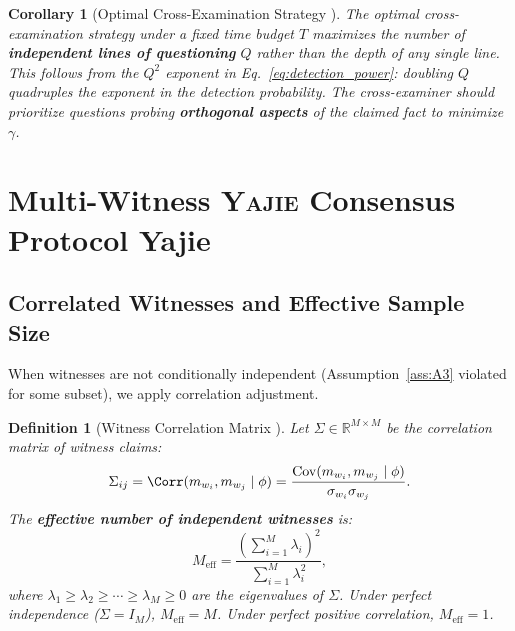 \documentclass[11pt,a4paper]{article}
\newtheorem{corollary}[theorem]{Corollary}
\newtheorem{definition}[theorem]{Definition}
\theoremstyle{definition}
\newcommand{\Yajie}{\textsc{Yajie}}
\DeclareMathOperator{\Cov}{Cov}
\newcommand{\R}{\mathbb{R}}
\newcommand{\fact}{\phi}                        %
\begin{document}
\begin{corollary}[Optimal Cross-Examination Strategy ]
\label{cor:optimal_cross}
The optimal cross-examination strategy under a fixed time budget $T$ maximizes the number of \textbf{independent lines of questioning} $Q$ rather than the depth of any single line. This follows from the $Q^2$ exponent in Eq.~\eqref{eq:detection_power}: doubling $Q$ quadruples the exponent in the detection probability. The cross-examiner should prioritize questions probing \textbf{orthogonal aspects} of the claimed fact to minimize $\gamma$.
\end{corollary}

\section{Multi-Witness \Yajie{} Consensus Protocol Yajie}
\label{sec:yajie}

\subsection{Correlated Witnesses and Effective Sample Size }
\label{sec:dependence}

When witnesses are not conditionally independent (Assumption~\ref{ass:A3} violated for some subset), we apply correlation adjustment.

\begin{definition}[Witness Correlation Matrix ]
\label{def:corrmat}
Let $\Sigma \in \R^{M \times M}$ be the correlation matrix of witness claims:
\begin{equation}
    \Sigma_{ij} = \Corr(m_{w_i}, m_{w_j} \mid \fact) = \frac{\Cov(m_{w_i}, m_{w_j} \mid \fact)}{\sigma_{w_i} \sigma_{w_j}}.
    \label{eq:corrmat}
\end{equation}
The \textbf{effective number of independent witnesses} is:
\begin{equation}
    M_{\mathrm{eff}} = \frac{(\sum_{i=1}^M \lambda_i)^2}{\sum_{i=1}^M \lambda_i^2},
    \label{eq:M_eff}
\end{equation}
where $\lambda_1 \geq \lambda_2 \geq \cdots \geq \lambda_M \geq 0$ are the eigenvalues of $\Sigma$. Under perfect independence ($\Sigma = I_M$), $M_{\mathrm{eff}} = M$. Under perfect positive correlation, $M_{\mathrm{eff}} = 1$.
\end{definition}
\end{document}
